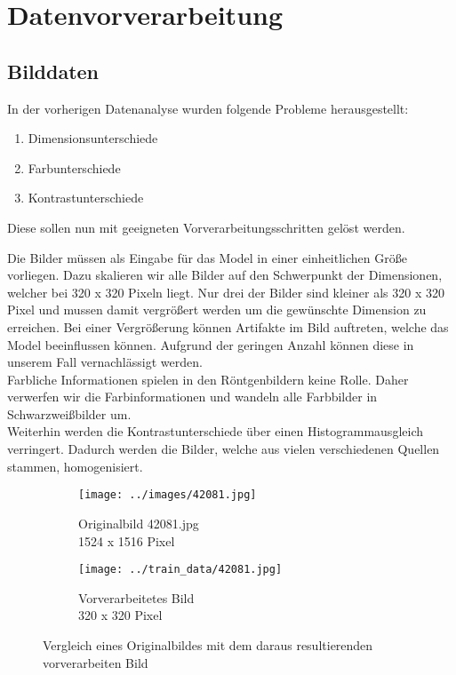 \chapter{Datenvorverarbeitung}
\label{ch:data_preprocessing}

\section{Bilddaten}

In der vorherigen Datenanalyse wurden folgende Probleme herausgestellt:

\begin{enumerate}
	\item{Dimensionsunterschiede}
	\item{Farbunterschiede}
	\item{Kontrastunterschiede}
\end{enumerate}

Diese sollen nun mit geeigneten Vorverarbeitungsschritten gelöst werden.

Die Bilder müssen als Eingabe für das Model in einer einheitlichen Größe vorliegen. Dazu skalieren wir alle Bilder auf den Schwerpunkt der Dimensionen, welcher bei 320 x 320 Pixeln liegt.
Nur drei der Bilder sind kleiner als 320 x 320 Pixel und mussen damit vergrößert werden um die gewünschte Dimension zu erreichen. Bei einer Vergrößerung können Artifakte im Bild auftreten, welche das Model beeinflussen können. Aufgrund der geringen Anzahl können diese in unserem Fall vernachlässigt werden.\\
Farbliche Informationen spielen in den Röntgenbildern keine Rolle. Daher verwerfen wir die Farbinformationen und wandeln alle Farbbilder in Schwarzweißbilder um.\\
Weiterhin werden die Kontrastunterschiede über einen Histogrammausgleich verringert. Dadurch werden die Bilder, welche aus vielen verschiedenen Quellen stammen, homogenisiert.

\begin{figure}[H]
	\centering
	\begin{subfigure}[b]{0.45\textwidth}
		\centering
		\texttt{[image: ../images/42081.jpg]}
		\caption{Originalbild 42081.jpg\\1524 x 1516 Pixel}
	\end{subfigure} \hfill
	\begin{subfigure}[b]{0.45\textwidth}
		\centering
		\texttt{[image: ../train\_data/42081.jpg]}
		\caption{Vorverarbeitetes Bild\\320 x 320 Pixel}
	\end{subfigure} \hfill
	\caption{Vergleich eines Originalbildes mit dem daraus resultierenden vorverarbeiten Bild}
\end{figure}